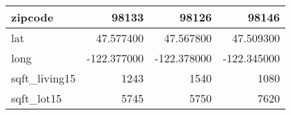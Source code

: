 \begin{table}[H]
\begin{tabular}{|l|r|r|r|}
\hline zipcode & \cellcolor[rgb]{0.9, 0.54, 0.52} 98133 & 98126 & 98146 \\
\hline lat & \cellcolor[rgb]{0.9, 0.54, 0.52} 47.577400 & 47.567800 & 47.509300 \\
\hline long & \cellcolor[rgb]{0.9, 0.54, 0.52} -122.377000 & \cellcolor[rgb]{0.9, 0.54, 0.52} -122.378000 & \cellcolor[rgb]{0.9, 0.54, 0.52} -122.345000 \\
\hline sqft\_living15 & \cellcolor[rgb]{0.9, 0.54, 0.52} 1243 & 1540 & 1080 \\
\hline sqft\_lot15 & \cellcolor[rgb]{0.9, 0.54, 0.52} 5745 & 5750 & 7620 \\
\hline
\end{tabular}
\end{table}
